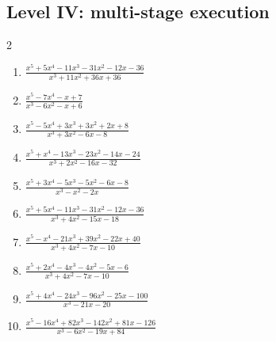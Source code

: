 \documentclass[11pt,oneside]{book}
\begin{document}
\subsection*{Level IV: multi-stage execution}
\begin{multicols}{2}
\begin{enumerate}[leftmargin=*,label=\textbf{\arabic*.},itemsep=0.65\baselineskip]
\item $\displaystyle \frac{x^{5} + 5 x^{4} - 11 x^{3} - 31 x^{2} - 12 x - 36}{x^{3} + 11 x^{2} + 36 x + 36}$
\item $\displaystyle \frac{x^{5} - 7 x^{4} - x + 7}{x^{3} - 6 x^{2} - x + 6}$
\item $\displaystyle \frac{x^{5} - 5 x^{4} + 3 x^{3} + 3 x^{2} + 2 x + 8}{x^{3} + 3 x^{2} - 6 x - 8}$
\item $\displaystyle \frac{x^{5} + x^{4} - 13 x^{3} - 23 x^{2} - 14 x - 24}{x^{3} + 2 x^{2} - 16 x - 32}$
\item $\displaystyle \frac{x^{5} + 3 x^{4} - 5 x^{3} - 5 x^{2} - 6 x - 8}{x^{3} - x^{2} - 2 x}$
\item $\displaystyle \frac{x^{5} + 5 x^{4} - 11 x^{3} - 31 x^{2} - 12 x - 36}{x^{3} + 4 x^{2} - 15 x - 18}$
\item $\displaystyle \frac{x^{5} - x^{4} - 21 x^{3} + 39 x^{2} - 22 x + 40}{x^{3} + 4 x^{2} - 7 x - 10}$
\item $\displaystyle \frac{x^{5} + 2 x^{4} - 4 x^{3} - 4 x^{2} - 5 x - 6}{x^{3} + 4 x^{2} - 7 x - 10}$
\item $\displaystyle \frac{x^{5} + 4 x^{4} - 24 x^{3} - 96 x^{2} - 25 x - 100}{x^{3} - 21 x - 20}$
\item $\displaystyle \frac{x^{5} - 16 x^{4} + 82 x^{3} - 142 x^{2} + 81 x - 126}{x^{3} - 6 x^{2} - 19 x + 84}$
\end{enumerate}
\end{multicols}
\end{document}

